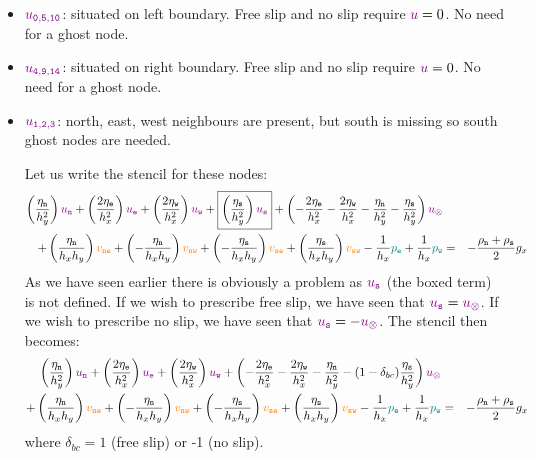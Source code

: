 \begin{itemize}
\item ${\color{violet} u_{\tt 0,5,10}}$: situated on left boundary. Free slip and no slip require ${\color{violet} u}=0$. No need for a ghost node.
\item ${\color{violet} u_{\tt 4,9,14}}$: situated on right boundary. Free slip and no slip require ${\color{violet} u}=0$. No need for a ghost node.
\item ${\color{violet} u_{\tt 1,2,3}}$: north, east, west neighbours are present, but south is missing so south ghost nodes are needed.

Let us write the stencil for these nodes:
\begin{eqnarray}
\left( \frac{\eta_{\tt n}}{h_y^2} \right) {\color{violet} u_{\tt n}} + 
\left( \frac{2\eta_{\tt e}}{h_x^2} \right) {\color{violet} u_{\tt e}} + 
\left( \frac{2\eta_{\tt w}}{h_x^2} \right) {\color{violet} u_{\tt w}} + 
\boxed{\left( \frac{\eta_{\tt s}}{h_y^2} \right) {\color{violet} u_{\tt s}}} + 
\left( -\frac{2\eta_{\tt e}}{h_x^2} -\frac{2\eta_{\tt w}}{h_x^2}  
-\frac{\eta_{\tt n}}{h_y^2} -\frac{\eta_{\tt s}}{h_y^2}  
\right) {\color{violet} u_\otimes} \nonumber\\
+
\left( \frac{\eta_{\tt n}}{h_x h_y} \right) {\color{orange} v_{\tt ne}}+ 
\left(-\frac{\eta_{\tt n}}{h_x h_y} \right) {\color{orange} v_{\tt nw}}+ 
\left(-\frac{\eta_{\tt s}}{h_x h_y} \right) {\color{orange} v_{\tt se}}+ 
\left( \frac{\eta_{\tt s}}{h_x h_y} \right) {\color{orange} v_{\tt sw}} 
- \frac{1}{h_x} {\color{teal}p_{\tt e}} + \frac{1}{h_x} {\color{teal}p_{\tt w}} 
&=& -\frac{\rho_{\tt n}+\rho_{\tt s}}{2} g_x \nonumber
\end{eqnarray}
As we have seen earlier there is obviously a problem as ${\color{violet} u_{\tt s}}$ (the boxed term)
is not defined.
If we wish to prescribe free slip, we have seen that ${\color{violet} u_{\tt s}}={\color{violet} u_\otimes}$.
If we wish to prescribe no slip, we have seen that ${\color{violet} u_{\tt s}}=-{\color{violet} u_\otimes}$.
The stencil then becomes:
\begin{eqnarray}
\left( \frac{\eta_{\tt n}}{h_y^2} \right) {\color{violet} u_{\tt n}} + 
\left( \frac{2\eta_{\tt e}}{h_x^2} \right) {\color{violet} u_{\tt e}} + 
\left( \frac{2\eta_{\tt w}}{h_x^2} \right) {\color{violet} u_{\tt w}} + 
\left( -\frac{2\eta_{\tt e}}{h_x^2} -\frac{2\eta_{\tt w}}{h_x^2}  
-\frac{\eta_{\tt n}}{h_y^2} -(1-\delta_{bc})\frac{\eta_{\tt s}}{h_y^2}
\right) {\color{violet} u_\otimes} \nonumber\\
+
\left( \frac{\eta_{\tt n}}{h_x h_y} \right) {\color{orange} v_{\tt ne}}+ 
\left(-\frac{\eta_{\tt n}}{h_x h_y} \right) {\color{orange} v_{\tt nw}}+ 
\left(-\frac{\eta_{\tt s}}{h_x h_y} \right) {\color{orange} v_{\tt se}}+ 
\left( \frac{\eta_{\tt s}}{h_x h_y} \right) {\color{orange} v_{\tt sw}} 
- \frac{1}{h_x} {\color{teal}p_{\tt e}} + \frac{1}{h_x} {\color{teal}p_{\tt w}} 
&=& -\frac{\rho_{\tt n}+\rho_{\tt s}}{2} g_x \nonumber
\end{eqnarray}
where $\delta_{bc}=1$ (free slip) or -1 (no slip).




\end{itemize}
